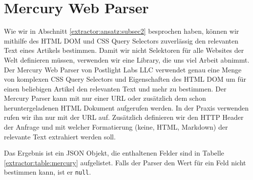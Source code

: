 \section{Mercury Web Parser}
Wie wir in Abschnitt \ref{extractor:ansatz:subsec2} besprochen haben, können wir mithilfe des \ac{HTML DOM} und CSS Query Selectors zuverlässig den relevanten Text  eines Artikels bestimmen. Damit wir nicht Selektoren für alle Websites der Welt definieren müssen, verwenden wir eine Library, die uns viel Arbeit abnimmt. Der Mercury Web Parser von Postlight Labs LLC\cite{mercury_homepage} verwendet genau eine Menge von komplexen CSS Query Selectors und Eigenschaften des HTML DOM um für einen beliebigen Artikel den relevanten Text und mehr zu bestimmen. Der Mercury Parser kann mit nur einer URL oder zusätzlich dem schon heruntergeladenen HTML Dokument aufgerufen werden. In der Praxis verwenden rufen wir ihn nur mit der URL auf. Zusätzlich definieren wir den HTTP Header der Anfrage und mit welcher Formatierung (keine, HTML, Markdown) der relevante Text extrahiert werden soll.



Das Ergebnis ist ein \ac{JSON} Objekt, die enthaltenen Felder sind in Tabelle \ref{extractor:table:mercury} aufgelistet. Falls der Parser den Wert für ein Feld nicht bestimmen kann, ist er \verb|null|.


